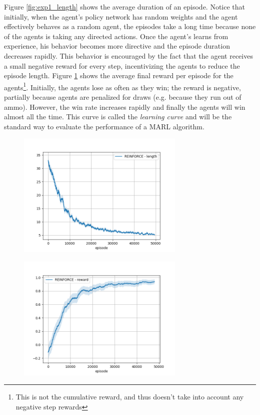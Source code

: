 Figure \ref{fig:exp1_length} shows the average duration of an episode. Notice that initially, when the agent's policy network has random weights and the agent effectively behaves as a random agent, the episodes take a long time because none of the agents is taking any directed actions. Once the agent's learns from experience, his behavior becomes more directive and the episode duration decreases rapidly. This behavior is encouraged by the fact that the agent receives a small negative reward for every step, incentivizing the agents to reduce the episode length. Figure \ref{fig:exp1_reward} shows the average final reward per episode for the agents\footnote{This is not the cumulative reward, and thus doesn't take into account any negative step rewards}. Initially, the agents lose as often as they win; the reward is negative, partially because agents are penalized for draws (e.g. because they run out of ammo). However, the win rate increases rapidly and finally the agents will win almost all the time. This curve is called the \emph{learning curve} and will be the standard way to evaluate the performance of a MARL algorithm.\\

\begin{figure}
\centering
\begin{minipage}{.5\textwidth}
  \centering
  \includegraphics[width=8cm]{images/experiment4/mean_length.png}
  \label{fig:exp1_length}
\end{minipage}%
\begin{minipage}{.5\textwidth}
  \centering
  \includegraphics[width=8cm]{images/experiment4/mean_reward.png}
  \label{fig:exp1_reward}
\end{minipage}
\end{figure}

